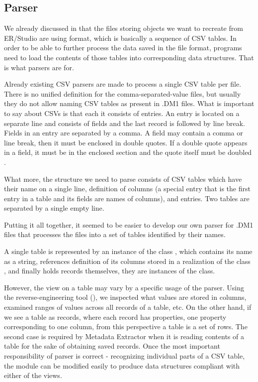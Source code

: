 \subsection{Parser}
\label{subsec:dm1_parser}

We already discussed in  that the files storing objects we want to recreate from ER/Studio are using format, which is basically a sequence of CSV tables. 
In order to be able to further process the data saved in the file format, programs need to load the contents of those tables into corresponding data structures. That is what parsers are for.

Already existing CSV parsers are made to process a single CSV table per file. There is no unified definition for the comma-separated-value files, but usually they do not allow naming CSV tables as present in .DM1 files.
What is important to say about CSVs is that each it consists of entries. 
An entry is located on a separate line and consists of fields and the last record is followed by line break. 
Fields in an entry are separated by a comma.
A field may contain a comma or line break, then it must be enclosed in double quotes.
If a double quote appears in a field, it must be in the enclosed section and the quote itself must be doubled \cite{RfcCSV}.

What more, the structure we need to parse consists of CSV tables which have their name on a single line, definition of columns (a special entry that is the first entry in a table and its fields are names of columns), and entries. 
Two tables are separated by a single empty line.

Putting it all together, it seemed to be easier to develop our own parser for .DM1 files that processes the files into a set of tables identified by their names.

A single table is represented by an instance of the class , which contains its name as a string, references definition of its columns stored in a realization of the class , and finally holds records themselves, they are instances of the  class.

However, the view on a table may vary by a specific usage of the parser. 
Using the reverse-engineering tool (), we inspected what values are stored in columns, examined ranges of values across all records of a table, etc.
On the other hand, if we see a table as records, where each record has properties, one property corresponding to one column, from this perspective a table is a set of rows.
The second case is required by Metadata Extractor when it is reading contents of a table for the sake of obtaining saved records. 
Once the most important responsibility of parser is correct - recognizing individual parts of a CSV table, the module can be modified easily to produce data structures compliant with either of the views.

